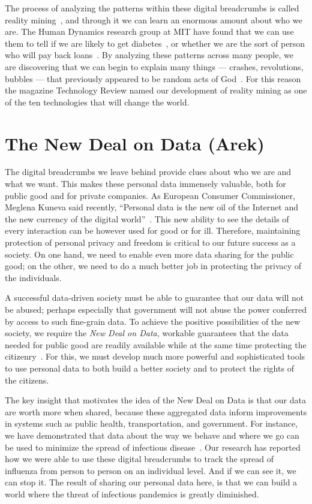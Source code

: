 The process of analyzing the patterns within these digital breadcrumbs is called reality mining~\cite{eagle2006reality,pentland2009reality}, and through it we can learn an enormous amount about who we are.
The Human Dynamics research group at MIT have found that we can use them to tell if we are likely to get diabetes~\cite{pentland2009using}, or whether we are the sort of person who will pay back loans~\cite{singh2013classifying}.
By analyzing these patterns across many people, we are discovering that we can begin to explain many things --- crashes, revolutions, bubbles --- that previously appeared to be random acts of God~\cite{pan2012decoding}.
For this reason the magazine Technology Review named our development of reality mining as one of the ten technologies that will change the world\cite{greene2008reality}. 

\section{The New Deal on Data (Arek)}

The digital breadcrumbs we leave behind provide clues about who we are and what we want.
This makes these personal data immensely valuable, both for public good and for private companies.
As European Consumer Commissioner, Meglena Kuneva said recently, ``Personal data is the new oil of the Internet and the new currency of the digital world''~\cite{kuneva2009}.
This new ability to see the details of every interaction can be however used for good or for ill.
Therefore, maintaining protection of personal privacy and freedom is critical to our future success as a society.
On one hand, we need to enable even more data sharing for the public good; on the other, we need to do a much better job in protecting the privacy of the individuals.

A successful data-driven society must be able to guarantee that our data will not be abused; perhaps especially that government will not abuse the power conferred by access to such fine-grain data.
To achieve the positive possibilities of the new society, we require the \emph{New Deal on Data}, workable guarantees that the data needed for public good are readily available while at the same time protecting the citizenry~\cite{pentland2009reality}.
For this, we must develop much more powerful and sophisticated tools to use personal data to both build a better society and to protect the rights of the citizens.

The key insight that motivates the idea of the New Deal on Data is that our data are worth more when shared, because these aggregated data inform improvements in systems such as public health, transportation, and government.
For instance, we have demonstrated that data about the way we behave and where we go can be used to minimize the spread of infectious disease~\cite{madan2010social, pentland2009using}.
Our research has reported how we were able to use these digital breadcrumbs to track the spread of influenza from person to person on an individual level.
And if we can see it, we can stop it.
The result of sharing our personal data here, is that we can build a world where the threat of infectious pandemics is greatly diminished.


